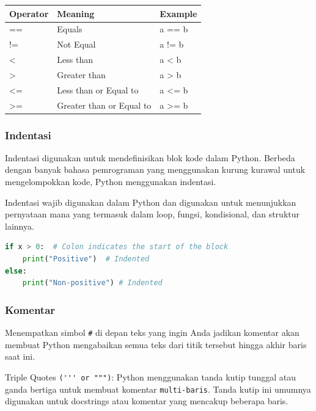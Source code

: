 \documentclass{article}
\begin{document}
\begin{tabularx}{\textwidth}{|X|X|X|}
    \hline
    \textbf{Operator} & \textbf{Meaning}         & \textbf{Example} \\
    \hline
    ==                & Equals                   & a == b           \\
    \hline
    !=                & Not Equal                & a != b           \\
    \hline
    <                 & Less than                & a < b            \\
    \hline
    >                 & Greater than             & a > b            \\
    \hline
    <=                & Less than or Equal to    & a <= b           \\
    \hline
    >=                & Greater than or Equal to & a >= b           \\
    \hline
\end{tabularx}

\subsubsection{Indentasi}
Indentasi digunakan untuk mendefinisikan blok kode dalam Python. Berbeda dengan banyak bahasa pemrograman yang menggunakan kurung kurawal {} untuk mengelompokkan kode, Python menggunakan indentasi.

Indentasi wajib digunakan dalam Python dan digunakan untuk menunjukkan pernyataan mana yang termasuk dalam loop, fungsi, kondisional, dan struktur lainnya.
\begin{lstlisting}[language=Python, caption={}, captionpos=b]
if x > 0:  # Colon indicates the start of the block
    print("Positive")  # Indented 
else:
    print("Non-positive") # Indented
\end{lstlisting}

\subsubsection{Komentar}
Menempatkan simbol \verb|#| di depan teks yang ingin Anda jadikan komentar akan membuat Python mengabaikan semua teks dari titik tersebut hingga akhir baris saat ini.

Triple Quotes \verb|(''' or """)|: Python menggunakan tanda kutip tunggal atau ganda bertiga untuk membuat komentar \verb|multi-baris|. Tanda kutip ini umumnya digunakan untuk docstrings atau komentar yang mencakup beberapa baris.
\end{document}
